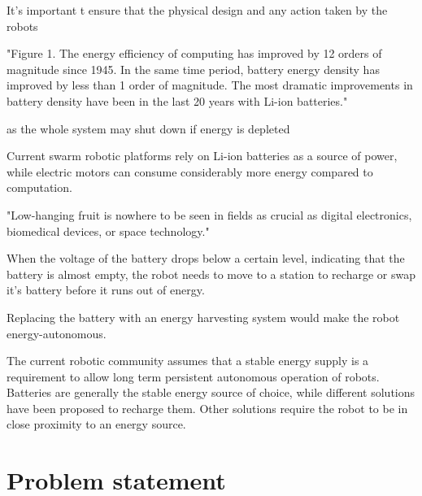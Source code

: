 It's important t ensure that the physical design and any action taken by the robots 

"Figure 1. The energy efficiency of computing has improved by 12 orders of magnitude since 1945. In the same time period, battery energy density has improved by less than 1 order of magnitude. The most dramatic improvements in battery density have been in the last 20 years with Li-ion batteries."
\cite{patel_pvc_2017}

 as the whole system may shut down if energy is depleted

Current swarm robotic platforms rely on Li-ion batteries as a source of power, while electric motors can consume considerably more energy compared to computation. %



"Low-hanging fruit is nowhere to be seen in fields as crucial as digital electronics, biomedical devices, or space technology."
\cite{zachary_spec_2016}





When the voltage of the battery drops below a certain level, indicating that the battery is almost empty, the robot needs to move to a station to recharge or swap it's battery before it runs out of energy.

Replacing the battery with an energy harvesting system would make the robot energy-autonomous. 


The current robotic community assumes that a stable energy supply is a requirement to allow long term persistent autonomous operation of robots.
Batteries are generally the stable energy source of choice, while different solutions have been proposed to recharge them.
Other solutions require the robot to be in close proximity to an energy source.








\section{Problem statement}

